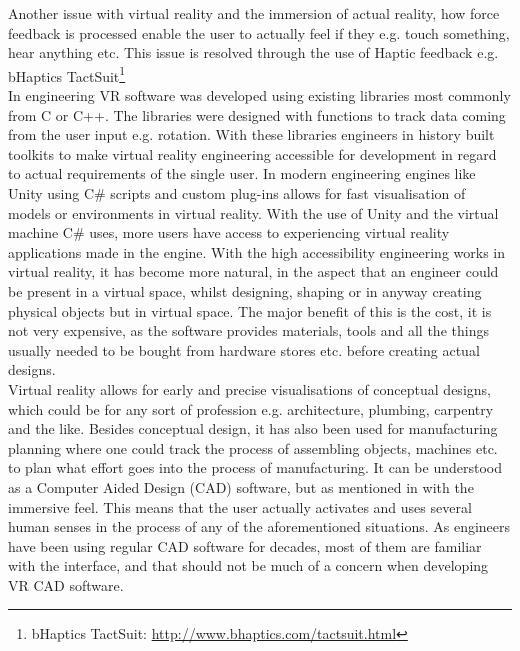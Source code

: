 		Another issue with virtual reality and the immersion of actual reality, how force feedback is processed enable the user to actually feel if they e.g. touch something, hear anything etc. This issue is resolved through the use of Haptic feedback e.g. bHaptics TactSuit\footnote{bHaptics TactSuit: \url{http://www.bhaptics.com/tactsuit.html}} \\
		
		In engineering VR software was developed using existing libraries most commonly from C or C++. The libraries were designed with functions to track data coming from the user input e.g. rotation. With these libraries engineers in history built toolkits to make virtual reality engineering accessible for development in regard to actual requirements of the single user. \cite{engineeringVR}
		In modern engineering engines like Unity using C\# scripts and custom plug-ins allows for fast visualisation of models or environments in virtual reality. With the use of Unity and the virtual machine C\# uses, more users have access to experiencing virtual reality applications made in the engine. With the high accessibility engineering works in virtual reality, it has become more natural, in the aspect that an engineer could be present in a virtual space, whilst designing, shaping or in anyway creating physical objects but in virtual space. The major benefit of this is the cost, it is not very expensive, as the software provides materials, tools and all the things usually needed to be bought from hardware stores etc. before creating actual designs. \\ 
		
		Virtual reality allows for early and precise visualisations of conceptual designs, which could be for any sort of profession e.g. architecture, plumbing, carpentry and the like. Besides conceptual design, it has also been used for manufacturing planning where one could track the process of assembling objects, machines etc. to plan what effort goes into the process of manufacturing. It can be understood as a Computer Aided Design (CAD) software, but as mentioned in \cite{engineeringVR} with the immersive feel. This means that the user actually activates and uses several human senses in the process of any of the aforementioned situations. As engineers have been using regular CAD software for decades, most of them are familiar with the interface, and that should not be much of a concern when developing VR CAD software.

									
